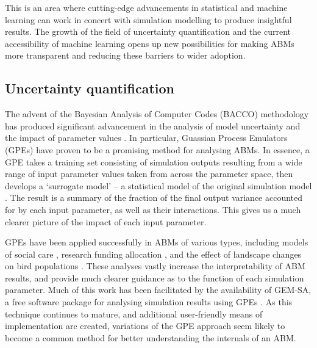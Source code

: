 \documentclass[review]{elsarticle}
\begin{document}
This is an area where cutting-edge advancements in statistical and machine learning can work in concert with simulation modelling to produce insightful results.  The growth of the field of uncertainty quantification and the current accessibility of machine learning opens up new possibilities for making ABMs more transparent and reducing these barriers to wider adoption.

\subsection{Uncertainty quantification}

The advent of the Bayesian Analysis of Computer Codes (BACCO) methodology has produced significant advancement in the analysis of model uncertainty and the impact of parameter values \citep{ohagan06}.  In particular, Guassian Process Emulators (GPEs) have proven to be a promising method for analysing ABMs.  In essence, a GPE takes a training set consisting of simulation outputs resulting from a wide range of input parameter values taken from across the parameter space, then develops a `surrogate model' -- a statistical model of the original simulation model \citep{kennedy01}.  The result is a summary of the fraction of the final output variance accounted for by each input parameter, as well as their interactions.  This gives us a much clearer picture of the impact of each input parameter.  

GPEs have been applied successfully in ABMs of various types, including models of social care \citep{silverman2013soc}, research funding allocation \citep{silverman2016}, and the effect of landscape changes on bird populations \citep{parry2013}.  These analyses vastly increase the interpretability of ABM results, and provide much clearer guidance as to the function of each simulation parameter.  Much of this work has been facilitated by the availability of GEM-SA, a free software package for analysing simulation results using GPEs \citep{kennedy2004}.  As this technique continues to mature, and additional user-friendly means of implementation are created, variations of the GPE approach seem likely to become a common method for better understanding the internals of an ABM.

\end{document}
